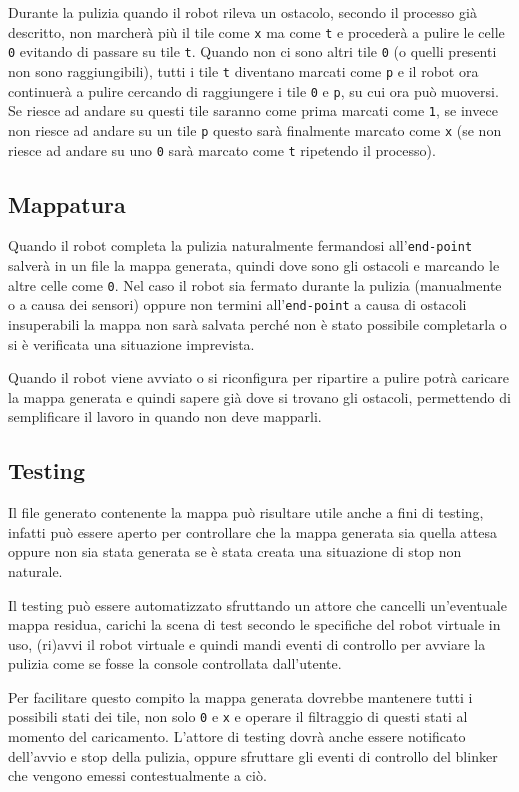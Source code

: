 Durante la pulizia quando il robot rileva un ostacolo, secondo il processo già descritto, non marcherà più il tile come \texttt{x} ma come \texttt{t} e procederà a pulire le celle \texttt{0} evitando di passare su tile \texttt{t}. Quando non ci sono altri tile \texttt{0} (o quelli presenti non sono raggiungibili), tutti i tile \texttt{t} diventano marcati come \texttt{p} e il robot ora continuerà a pulire cercando di raggiungere i tile \texttt{0} e \texttt{p}, su cui ora può muoversi. Se riesce ad andare su questi tile saranno come prima marcati come \texttt{1}, se invece non riesce ad andare su un tile \texttt{p} questo sarà finalmente marcato come \texttt{x} (se non riesce ad andare su uno \texttt{0} sarà marcato come \texttt{t} ripetendo il processo).

\subsection{Mappatura}
Quando il robot completa la pulizia naturalmente fermandosi all'\texttt{end-point} salverà in un file la mappa generata, quindi dove sono gli ostacoli e marcando le altre celle come \texttt{0}. Nel caso il robot sia fermato durante la pulizia (manualmente o a causa dei sensori) oppure non termini all'\texttt{end-point} a causa di ostacoli insuperabili la mappa non sarà salvata perché non è stato possibile completarla o si è verificata una situazione imprevista.

Quando il robot viene avviato o si riconfigura per ripartire a pulire potrà caricare la mappa generata e quindi sapere già dove si trovano gli ostacoli, permettendo di semplificare il lavoro in quando non deve mapparli.

\subsection{Testing}
Il file generato contenente la mappa può risultare utile anche a fini di testing, infatti può essere aperto per controllare che la mappa generata sia quella attesa oppure non sia stata generata se è stata creata una situazione di stop non naturale.

Il testing può essere automatizzato sfruttando un attore che cancelli un'eventuale mappa residua, carichi la scena di test secondo le specifiche del robot virtuale in uso, (ri)avvi il robot virtuale e quindi mandi eventi di controllo per avviare la pulizia come se fosse la console controllata dall'utente.

Per facilitare questo compito la mappa generata dovrebbe mantenere tutti i possibili stati dei tile, non solo \texttt{0} e \texttt{x} e operare il filtraggio di questi stati al momento del caricamento. L'attore di testing dovrà anche essere notificato dell'avvio e stop della pulizia, oppure sfruttare gli eventi di controllo del blinker che vengono emessi contestualmente a ciò.

